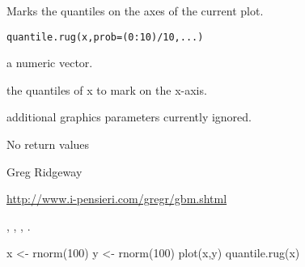 \begin{Description}\relax
Marks the quantiles on the axes of the current plot.
\end{Description}
\begin{Usage}
\begin{verbatim}
quantile.rug(x,prob=(0:10)/10,...)
\end{verbatim}
\end{Usage}
\begin{Arguments}
\begin{ldescription}
\item[\code{x}] a numeric vector.
\item[\code{prob}] the quantiles of x to mark on the x-axis.
\item[\code{...}] additional graphics parameters currently ignored.
\end{ldescription}
\end{Arguments}
\begin{Value}
No return values
\end{Value}
\begin{Author}\relax
Greg Ridgeway 
\end{Author}
\begin{References}\relax
\url{http://www.i-pensieri.com/gregr/gbm.shtml}
\end{References}
\begin{SeeAlso}\relax
{}, 
, 
, 
.
\end{SeeAlso}
\begin{Examples}
\begin{ExampleCode}
x <- rnorm(100)
y <- rnorm(100)
plot(x,y)
quantile.rug(x)
\end{ExampleCode}
\end{Examples}

